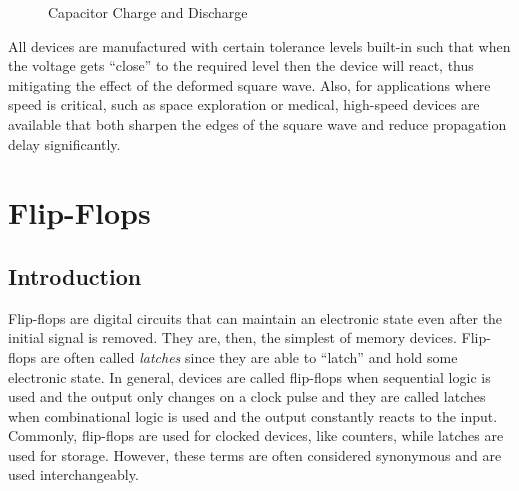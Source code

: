 \begin{figure}[H]
  \myfloatalign
  \caption{Capacitor Charge and Discharge}
	\label{drw:09_01}  
\end{figure}

All devices are manufactured with certain tolerance levels built-in such that when the voltage gets ``close'' to the required level then the device will react, thus mitigating the effect of the deformed square wave. Also, for applications where speed is critical, such as space exploration or medical, high-speed devices are available that both sharpen the edges of the square wave and reduce propagation delay significantly. 

\section{Flip-Flops}
\label{SL:sec:flip-flops}

\subsection{Introduction}
\label{SL:subsec:intro_to_flip-flops}

Flip-flops are digital circuits that can maintain an electronic state even after the initial signal is removed. They are, then, the simplest of memory devices. Flip-flops are often called \emph{latches} since they are able to ``latch'' and hold some electronic state. In general, devices are called flip-flops when sequential logic is used and the output only changes on a clock pulse and they are called latches when combinational logic is used and the output constantly reacts to the input. Commonly, flip-flops are used for clocked devices, like counters, while latches are used for storage. However, these terms are often considered synonymous and are used interchangeably.

